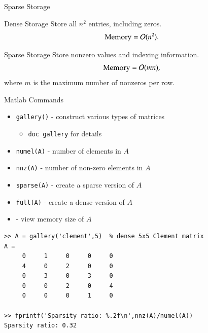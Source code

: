 \documentclass[10pt]{beamer}
\begin{document}

\begin{frame}{Sparse Storage}

\begin{block}{Dense Storage}
Store all $n^2$ entries, including zeros.
\[
    \text{Memory}={\mathcal{O}}(n^2).
\]
\end{block}

\begin{block}{Sparse Storage}
Store nonzero values and indexing information.
\[
    \text{Memory}={\mathcal{O}}(mn),
\]
where $m$ is the maximum number of nonzeros per row.
\end{block}


\end{frame}




\begin{frame}[fragile]{Matlab Commands}
\begin{itemize}
    \item \texttt{gallery()} - construct various types of matrices 
    \begin{itemize}
        \item \texttt{doc gallery} for details
    \end{itemize}
    \item \texttt{numel(A)} - number of elements in $A$
    \item \texttt{nnz(A)} - number of non-zero elements in $A$
    \item \texttt{sparse(A)} - create a sparse version of $A$
    \item \texttt{full(A)} - create a dense version of $A$
    \item {} - view memory size of $A$

\end{itemize}
\begin{lstlisting}
>> A = gallery('clement',5)  % dense 5x5 Clement matrix 
A =
     0     1     0     0     0
     4     0     2     0     0
     0     3     0     3     0
     0     0     2     0     4
     0     0     0     1     0

>> fprintf('Sparsity ratio: %.2f\n',nnz(A)/numel(A))
Sparsity ratio: 0.32
\end{lstlisting}
\end{frame}
\end{document}
